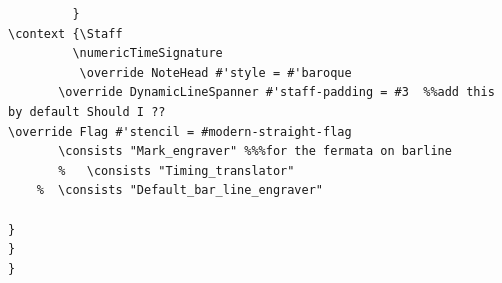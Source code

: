 \documentclass{article}
\begin{document}
\begin{verbatim}
         }
\context {\Staff
         \numericTimeSignature
          \override NoteHead #'style = #'baroque
	   \override DynamicLineSpanner #'staff-padding = #3  %%add this by default Should I ??
\override Flag #'stencil = #modern-straight-flag
	   \consists "Mark_engraver" %%%for the fermata on barline
       %   \consists "Timing_translator"
	%  \consists "Default_bar_line_engraver"

}
}
}


\end{verbatim}

{} 

\end{document}
